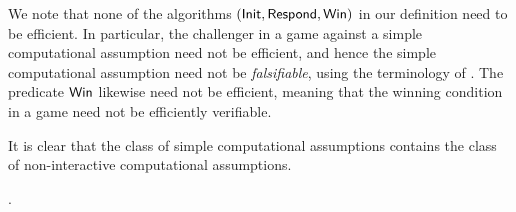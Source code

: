 \begin{remark}
  We note that none of the algorithms \((\mathsf{Init},\mathsf{Respond},\mathsf{Win})\)
  in our definition need to be efficient.
  In particular, the challenger in a \SICA
  game against a simple computational assumption
  need not be efficient,
  and hence the simple computational assumption need not be \emph{falsifiable},
  using the terminology of .
  The predicate \(\mathsf{Win}\) likewise need not be efficient,
  meaning that the winning condition in a \SICA game
  need not be efficiently verifiable.
\end{remark}

\begin{remark}
  It is clear that the class of simple computational assumptions
  contains the class of non-interactive computational assumptions.

  .
\end{remark}



